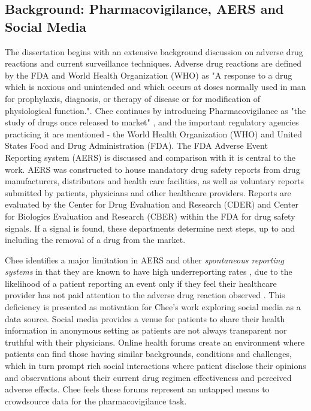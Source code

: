 \documentclass[twoside,11pt]{article}
\begin{document}
\subsection{Background: Pharmacovigilance, AERS and Social Media}
The dissertation begins with an extensive background discussion on adverse drug reactions and current surveillance techniques. Adverse drug reactions are defined by the FDA and World Health Organization (WHO) as "A response to a drug which is noxious and unintended and which occurs at doses normally used in man for prophylaxis, diagnosis, or therapy of disease or for modification of physiological function."\cite{FDA}. Chee continues by introducing Pharmacovigilance as "the study of drugs once released to market" \citep{Chee}, and the important regulatory agencies practicing it are mentioned - the World Health Organization (WHO) and United States Food and Drug Administration (FDA). The FDA Adverse Event Reporting system (AERS) is discussed and comparison with it is central to the work. AERS was constructed to house mandatory drug safety reports from drug manufacturers, distributors and health care facilities, as well as voluntary reports submitted by patients, physicians and other healthcare providers. Reports are evaluated by the Center for Drug Evaluation and Research (CDER) and Center for Biologics Evaluation and Research (CBER) within the FDA for drug safety signals. If a signal is found, these departments determine next steps, up to and including the removal of a drug from the market.  %

Chee identifies a major limitation in AERS and other \textit{spontaneous reporting systems} in that they are known to have high underreporting rates \citep{Fletcher}, due to the likelihood of a patient reporting an event only if they feel their healthcare provider has not paid attention to the adverse drug reaction observed \citep{Leamon}. This deficiency is presented as motivation for Chee's work exploring social media as a data source. Social media provides a venue for patients to share their health information in anonymous setting as patients are not always transparent nor truthful with their physicians. Online health forums create an environment where patients can find those having similar backgrounds, conditions and challenges, which in turn prompt rich social interactions where patient disclose their opinions and observations about their current drug regimen effectiveness and perceived adverse effects. Chee feels these forums represent an untapped means to crowdsource data for the pharmacovigilance task. %
\end{document}
